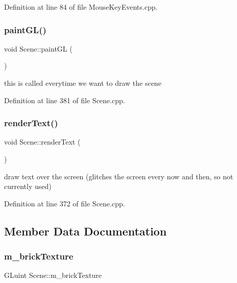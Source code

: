 Definition at line 84 of file Mouse\+Key\+Events.\+cpp.

\mbox{\label{class_scene_ab0c23a9c2bb68b75465b4fddcb7975a5}} 
\subsubsection{paintGL()}
{\footnotesize\ttfamily void Scene\+::paint\+GL (\begin{DoxyParamCaption}{ }\end{DoxyParamCaption})\hspace{0.3cm}{\ttfamily [override]}}



this is called everytime we want to draw the scene 



Definition at line 381 of file Scene.\+cpp.

\mbox{\label{class_scene_a07d7afcdb3f6f87730a9e3b2df60f96b}} 
\subsubsection{renderText()}
{\footnotesize\ttfamily void Scene\+::render\+Text (\begin{DoxyParamCaption}{ }\end{DoxyParamCaption})\hspace{0.3cm}{\ttfamily [private]}}



draw text over the screen (glitches the screen every now and then, so not currently used) 



Definition at line 372 of file Scene.\+cpp.



\subsection{Member Data Documentation}
\mbox{\label{class_scene_afd486c4c65677d09a9172a9d11c9e2f1}} 
\subsubsection{m\_brickTexture}
{\footnotesize\ttfamily G\+Luint Scene\+::m\+\_\+brick\+Texture\hspace{0.3cm}{\ttfamily [private]}}



